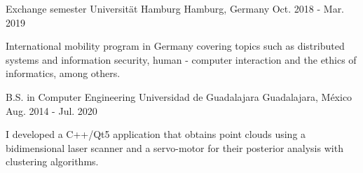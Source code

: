 \begin{cventries}
    \cventry
        {Exchange semester}
        {Universität Hamburg}
        {Hamburg, Germany}
        {Oct. 2018 - Mar. 2019}
        {
            \begin{cvitems}
                \item {International mobility program in Germany covering topics such as distributed systems and information security, human - computer interaction and the ethics of informatics, among others.}
            \end{cvitems}
        }
    \cventry
        {B.S. in Computer Engineering}
        {Universidad de Guadalajara}
        {Guadalajara, México}
        {Aug. 2014 - Jul. 2020}
        {
            \begin{cvitems}
                \item {I developed a C++/Qt5 application that obtains point clouds using a bidimensional laser scanner and a servo-motor for their posterior analysis with clustering algorithms.}
            \end{cvitems}
        }
\end{cventries}
